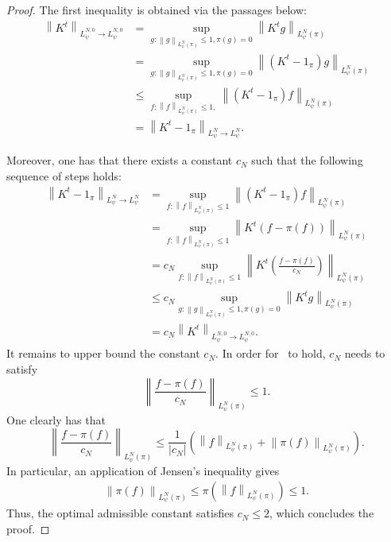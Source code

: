 \documentclass[11pt]{article}
\theoremstyle{plain}
\theoremstyle{remark}
\begin{document}
\begin{proof}
The first inequality is obtained via the passages below:
    \begin{align}
       \left\lVert K^t \right\rVert_{L_\psi^{N,0} \to L_\psi^{N,0}} &= \sup_{g : \left\lVert g \right\rVert_{L_\psi^N(\pi)} \leq 1, \pi(g)=0} \left\lVert K^t g \right\rVert_{L_\psi^N(\pi)} \\
       &= \sup_{g : \left\lVert g \right\rVert_{L_\psi^N(\pi)} \leq 1, \pi(g)=0} \left\lVert (K^t-1_\pi) g \right\rVert_{L_\psi^N(\pi)} \\
       &\leq  \sup_{f : \left\lVert f \right\rVert_{L_\psi^N(\pi)} \leq 1, } \left\lVert (K^t-1_\pi) f \right\rVert_{L_\psi^N(\pi)} \\
       &=  \left\lVert K^t-1_\pi \right\rVert_{L_\psi^{N} \to L_\psi^{N}}.
    \end{align}
    
    Moreover, one has that there exists a constant $c_N$ such that the following sequence of steps holds:
    \begin{align}
        \left\lVert K^t - 1_\pi \right\rVert_{L_\psi^N \to L_\psi^N} &= \sup_{f : \left\lVert f \right\rVert_{L_\psi^N(\pi)} \leq 1} \left\lVert (K^t - 1_\pi) f \right\rVert_{L_\psi^N(\pi)} \\ &= \sup_{f : \left\lVert f \right\rVert_{L_\psi^N(\pi)} \leq 1} \left\lVert K^t (f-\pi(f)) \right\rVert_{L_\psi^N(\pi)} \\
        &= c_N \sup_{f : \left\lVert f \right\rVert_{L_\psi^N(\pi)} \leq 1} \left\lVert K^t\left( \frac{f-\pi(f)}{c_N}\right) \right\rVert_{L_\psi^N(\pi)} \\
        &\leq c_N \sup_{g : \left\lVert g \right\rVert_{L_\psi^N(\pi)} \leq 1, \pi(g)=0} \left\lVert K^t g \right\rVert_{L_\psi^N(\pi)} \label{eq:constantStepContraction}\\ &= c_N \left\lVert K^t \right\rVert_{L_\psi^{N,0} \to L_\psi^{N,0}}.
    \end{align}
    It remains to upper bound the constant $c_N$. In order for~ to hold, $c_N$ needs to satisfy %
    $$\left\lVert \frac{f-\pi(f)}{c_N} \right\rVert_{L^N_\psi(\pi)}\leq 1.$$ %
    One clearly has that
    \begin{equation}
        \left\lVert \frac{f-\pi(f)}{c_N} \right\rVert_{L^N_\psi(\pi)}\leq \frac{1}{|c_N|} \left( \left\lVert f\right\rVert_{L^N_\psi(\pi)} +  \left\lVert \pi(f) \right\rVert_{L^N_\psi(\pi)}\right).
    \end{equation}
    In particular, an application of Jensen's inequality gives
    \begin{align}
        \left\lVert \pi(f) \right\rVert_{L_\psi^N(\pi)} \leq   \pi(\left\lVert f\right\rVert_{L_\psi^N(\pi)}) \leq 1.    \end{align}
        Thus, the optimal admissible constant satisfies \(c_N\leq2\), which concludes the proof. %
    \end{proof}
\end{document}
